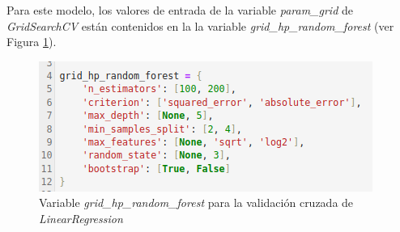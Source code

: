 \documentclass[12pt,a4paper,Spanish]{article}
\begin{document}
Para este modelo, los valores de entrada de la variable \textit{param\_grid} de \textit{GridSearchCV} están contenidos en la la variable \textit{grid\_hp\_random\_forest} (ver Figura \ref{fig:paramsforest}).
\begin{figure}[H]
	\centering
	\includegraphics[width=0.7\linewidth]{figs/params_forest}
	\caption{Variable \textit{grid\_hp\_random\_forest} para la validación cruzada de \textit{LinearRegression}}
	\label{fig:paramsforest}
\end{figure}
\end{document}
